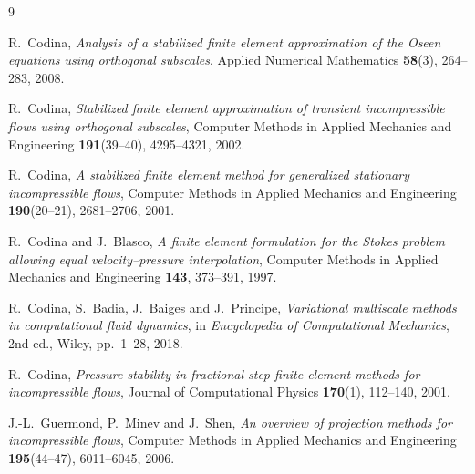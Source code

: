 \documentclass[11pt]{article}
\theoremstyle{plain}
\theoremstyle{definition}
\theoremstyle{remark}
\begin{document}
\begin{thebibliography}{9}

R.~Codina,
\emph{Analysis of a stabilized finite element approximation of the Oseen
equations using orthogonal subscales},
Applied Numerical Mathematics \textbf{58}(3), 264--283, 2008.

R.~Codina,
\emph{Stabilized finite element approximation of transient
incompressible flows using orthogonal subscales},
Computer Methods in Applied Mechanics and Engineering
\textbf{191}(39--40), 4295--4321, 2002.

R.~Codina,
\emph{A stabilized finite element method for generalized stationary
incompressible flows},
Computer Methods in Applied Mechanics and Engineering
\textbf{190}(20--21), 2681--2706, 2001.

R.~Codina and J.~Blasco,
\emph{A finite element formulation for the Stokes problem allowing equal
velocity--pressure interpolation},
Computer Methods in Applied Mechanics and Engineering
\textbf{143}, 373--391, 1997.

R.~Codina, S.~Badia, J.~Baiges and J.~Principe,
\emph{Variational multiscale methods in computational fluid dynamics},
in \emph{Encyclopedia of Computational Mechanics}, 2nd ed., Wiley,
pp.~1--28, 2018.

R.~Codina,
\emph{Pressure stability in fractional step finite element methods for
incompressible flows},
Journal of Computational Physics \textbf{170}(1), 112--140, 2001.

J.-L.~Guermond, P.~Minev and J.~Shen,
\emph{An overview of projection methods for incompressible flows},
Computer Methods in Applied Mechanics and Engineering
\textbf{195}(44--47), 6011--6045, 2006.

\end{thebibliography}
\end{document}
